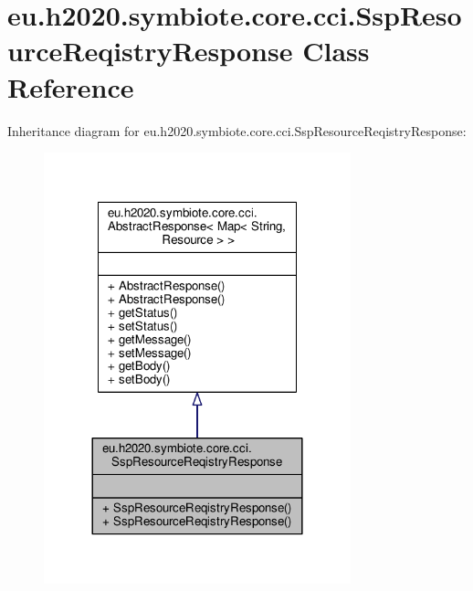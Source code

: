 \hypertarget{classeu_1_1h2020_1_1symbiote_1_1core_1_1cci_1_1SspResourceReqistryResponse}{}\section{eu.\+h2020.\+symbiote.\+core.\+cci.\+Ssp\+Resource\+Reqistry\+Response Class Reference}
\label{classeu_1_1h2020_1_1symbiote_1_1core_1_1cci_1_1SspResourceReqistryResponse}


Inheritance diagram for eu.\+h2020.\+symbiote.\+core.\+cci.\+Ssp\+Resource\+Reqistry\+Response\+:\nopagebreak
\begin{figure}[H]
\begin{center}
\leavevmode
\includegraphics[width=252pt]{classeu_1_1h2020_1_1symbiote_1_1core_1_1cci_1_1SspResourceReqistryResponse__inherit__graph}
\end{center}
\end{figure}


